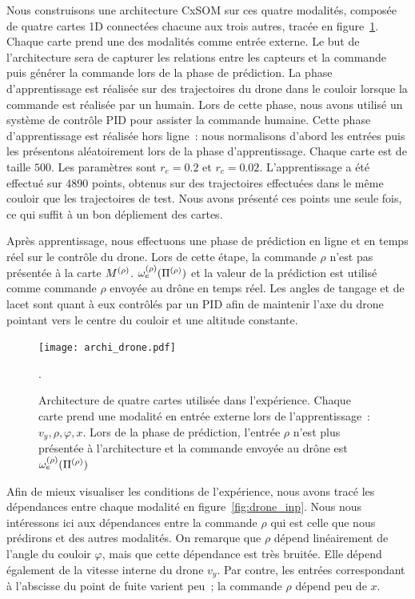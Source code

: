 \documentclass[../main]{subfiles}
\begin{document}
Nous construisons une architecture CxSOM sur ces quatre modalités, composée de quatre cartes 1D connectées chacune aux trois autres, tracée en figure~\ref{fig:archi_drone}. Chaque carte prend une des modalités comme entrée externe.
Le but de l'architecture sera de capturer les relations entre les capteurs et la commande puis générer la commande lors de la phase de prédiction.
La phase d'apprentissage est réalisée sur des trajectoires du drone dans le couloir lorsque la commande est réalisée par un humain.
Lors de cette phase, nous avons utilisé un système de contrôle PID pour assister la commande humaine. 
Cette phase d'apprentissage est réalisée hors ligne~: nous normalisons d'abord les entrées puis les présentons aléatoirement lors de la phase d'apprentissage.
Chaque carte est de taille $500$. Les paramètres sont $r_e = 0.2$ et $r_c = 0.02$.
L'apprentissage a été effectué sur 4890 points, obtenus sur des trajectoires effectuées dans le même couloir que les trajectoires de test. Nous avons présenté ces points une seule fois, ce qui suffit à un bon dépliement des cartes.


Après apprentissage, nous effectuons une phase de prédiction en ligne et en temps réel sur le contrôle du drone.
Lors de cette étape, la commande $\rho$ n'est pas présentée à la carte $M^{({\rho})}$. $\omega_e^{({\rho})}(\Pi^{({\rho})})$ et la valeur de la prédiction est utilisé comme commande $\rho$ envoyée au drône en temps réel.
Les angles de tangage et de lacet sont quant à eux contrôlés par un PID afin de maintenir l'axe du drone pointant vers le centre du couloir et une altitude constante.

\begin{figure}
	\centering\texttt{[image: archi\_drone.pdf]}
	\caption{Architecture de quatre cartes utilisée dans l'expérience. Chaque carte prend une modalité en entrée externe lors de l'apprentissage~: $v_y,\rho,\varphi,x$. Lors de la phase de prédiction, l'entrée $\rho$ n'est plus présentée à l'architecture et la commande envoyée au drône est $\omega_e^{({\rho})}(\Pi^{({\rho})})$\label{fig:archi_drone}}.
\end{figure}

Afin de mieux visualiser les conditions de l'expérience, nous avons tracé les dépendances entre chaque modalité en figure~\ref{fig:drone_inp}.
Nous nous intéressons ici aux dépendances entre la commande $\rho$ qui est celle que nous prédirons et des autres modalités.
On remarque que $\rho$ dépend linéairement de l'angle du couloir $\varphi$, mais que cette dépendance est très bruitée. Elle dépend également de la vitesse interne du drone $v_y$. Par contre, les entrées correspondant à l'abscisse du point de fuite varient peu~; la commande $\rho$ dépend peu de $x$.
\end{document}
